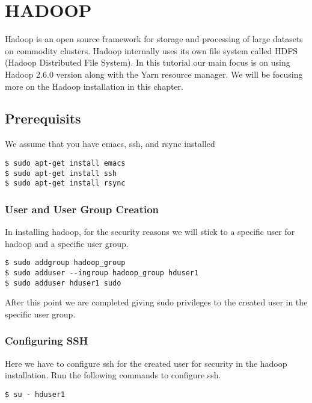 \section{HADOOP}\label{hadoop}

Hadoop is an open source framework for storage and processing of large
datasets on commodity clusters. Hadoop internally uses its own file
system called HDFS (Hadoop Distributed File System). In this tutorial
our main focus is on using Hadoop 2.6.0 version along with the Yarn
resource manager. We will be focusing more on the Hadoop installation in
this chapter.

\subsection{Prerequisits}\label{prerequisits}

We assume that you have emacs, ssh, and rsync installed

\begin{lstlisting}
$ sudo apt-get install emacs
$ sudo apt-get install ssh
$ sudo apt-get install rsync
\end{lstlisting}

\subsubsection{User and User Group
Creation}\label{user-and-user-group-creation}

In installing hadoop, for the security reasons we will stick to a
specific user for hadoop and a specific user group.

\begin{lstlisting}
$ sudo addgroup hadoop_group
$ sudo adduser --ingroup hadoop_group hduser1
$ sudo adduser hduser1 sudo
\end{lstlisting}

After this point we are completed giving sudo privileges to the created
user in the specific user group.

\subsubsection{Configuring SSH}\label{configuring-ssh}

Here we have to configure ssh for the created user for security in the
hadoop installation. Run the following commands to configure ssh.

\begin{lstlisting}
$ su - hduser1
\end{lstlisting}

